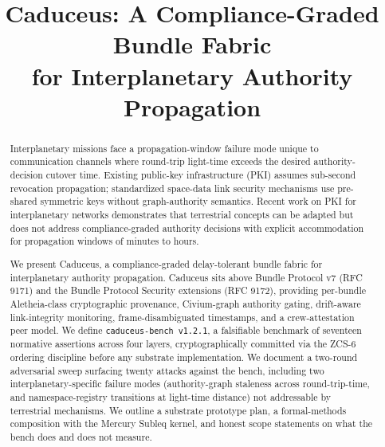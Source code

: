 \documentclass[conference]{IEEEtran}
\begin{document}
\title{Caduceus: A Compliance-Graded Bundle Fabric \\for Interplanetary Authority Propagation}

\author{
}

\maketitle

\begin{abstract}
Interplanetary missions face a propagation-window failure mode unique to communication channels where round-trip light-time exceeds the desired authority-decision cutover time. Existing public-key infrastructure (PKI) assumes sub-second revocation propagation; standardized space-data link security mechanisms use pre-shared symmetric keys without graph-authority semantics. Recent work on PKI for interplanetary networks demonstrates that terrestrial concepts can be adapted but does not address compliance-graded authority decisions with explicit accommodation for propagation windows of minutes to hours.

We present Caduceus, a compliance-graded delay-tolerant bundle fabric for interplanetary authority propagation. Caduceus sits above Bundle Protocol v7 (RFC 9171) and the Bundle Protocol Security extensions (RFC 9172), providing per-bundle Aletheia-class cryptographic provenance, Civium-graph authority gating, drift-aware link-integrity monitoring, frame-disambiguated timestamps, and a crew-attestation peer model. We define \texttt{caduceus-bench v1.2.1}, a falsifiable benchmark of seventeen normative assertions across four layers, cryptographically committed via the ZCS-6 ordering discipline before any substrate implementation. We document a two-round adversarial sweep surfacing twenty attacks against the bench, including two interplanetary-specific failure modes (authority-graph staleness across round-trip-time, and namespace-registry transitions at light-time distance) not addressable by terrestrial mechanisms. We outline a substrate prototype plan, a formal-methods composition with the Mercury Subleq kernel, and honest scope statements on what the bench does and does not measure.
\end{abstract}
\end{document}
